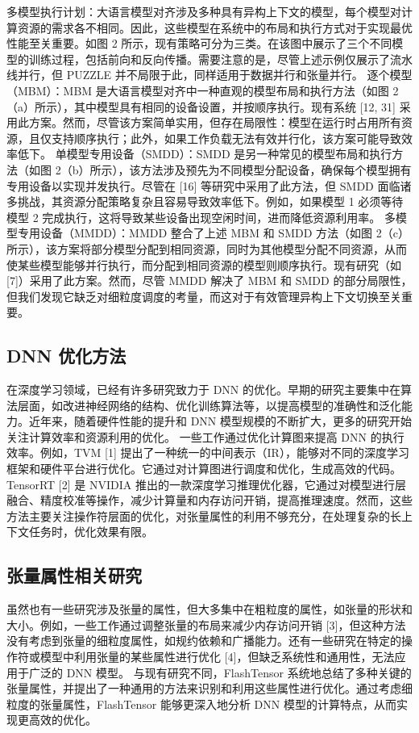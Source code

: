多模型执行计划：大语言模型对齐涉及多种具有异构上下文的模型，每个模型对计算资源的需求各不相同。因此，这些模型在系统中的布局和执行方式对于实现最优性能至关重要。如图 2 所示，现有策略可分为三类。在该图中展示了三个不同模型的训练过程，包括前向和反向传播。需要注意的是，尽管上述示例仅展示了流水线并行，但 PUZZLE 并不局限于此，同样适用于数据并行和张量并行。 
逐个模型（MBM）：MBM 是大语言模型对齐中一种直观的模型布局和执行方法（如图 2（a）所示），其中模型具有相同的设备设置，并按顺序执行。现有系统 [12, 31] 采用此方案。然而，尽管该方案简单实用，但存在局限性：模型在运行时占用所有资源，且仅支持顺序执行；此外，如果工作负载无法有效并行化，该方案可能导致效率低下。 
单模型专用设备（SMDD）：SMDD 是另一种常见的模型布局和执行方法（如图 2（b）所示），该方法涉及预先为不同模型分配设备，确保每个模型拥有专用设备以实现并发执行。尽管在 [16] 等研究中采用了此方法，但 SMDD 面临诸多挑战，其资源分配策略复杂且容易导致效率低下。例如，如果模型 1 必须等待模型 2 完成执行，这将导致某些设备出现空闲时间，进而降低资源利用率。 
多模型专用设备（MMDD）：MMDD 整合了上述 MBM 和 SMDD 方法（如图 2（c）所示），该方案将部分模型分配到相同资源，同时为其他模型分配不同资源，从而使某些模型能够并行执行，而分配到相同资源的模型则顺序执行。现有研究（如 [7]）采用了此方案。然而，尽管 MMDD 解决了 MBM 和 SMDD 的部分局限性，但我们发现它缺乏对细粒度调度的考量，而这对于有效管理异构上下文切换至关重要。 



\subsection{DNN 优化方法}
在深度学习领域，已经有许多研究致力于 DNN 的优化。早期的研究主要集中在算法层面，如改进神经网络的结构、优化训练算法等，以提高模型的准确性和泛化能力。近年来，随着硬件性能的提升和 DNN 模型规模的不断扩大，更多的研究开始关注计算效率和资源利用的优化。
一些工作通过优化计算图来提高 DNN 的执行效率。例如，TVM [1] 提出了一种统一的中间表示（IR），能够对不同的深度学习框架和硬件平台进行优化。它通过对计算图进行调度和优化，生成高效的代码。TensorRT [2] 是 NVIDIA 推出的一款深度学习推理优化器，它通过对模型进行层融合、精度校准等操作，减少计算量和内存访问开销，提高推理速度。然而，这些方法主要关注操作符层面的优化，对张量属性的利用不够充分，在处理复杂的长上下文任务时，优化效果有限。
\subsection{张量属性相关研究}
虽然也有一些研究涉及张量的属性，但大多集中在粗粒度的属性，如张量的形状和大小。例如，一些工作通过调整张量的布局来减少内存访问开销 [3]，但这种方法没有考虑到张量的细粒度属性，如规约依赖和广播能力。还有一些研究在特定的操作符或模型中利用张量的某些属性进行优化 [4]，但缺乏系统性和通用性，无法应用于广泛的 DNN 模型。
与现有研究不同，FlashTensor 系统地总结了多种关键的张量属性，并提出了一种通用的方法来识别和利用这些属性进行优化。通过考虑细粒度的张量属性，FlashTensor 能够更深入地分析 DNN 模型的计算特点，从而实现更高效的优化。
